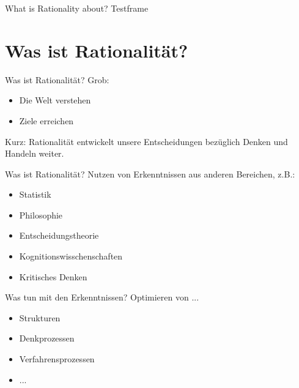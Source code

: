 \ifEnglish


\begin{frame}[c]{What is Rationality about?}
    Testframe
\end{frame}



\else

\section{Was ist Rationalität?}

\begin{frame}[c]{Was ist Rationalität?}
    \Large
    Grob:
    \newline
    \begin{itemize}
    \pause
    \item Die Welt verstehen    
    \newline
    \pause
    \pause
    \item Ziele erreichen       
    \newline
    \end{itemize}
    \pause
    \pause
    Kurz: Rationalität entwickelt unsere Entscheidungen bezüglich Denken und Handeln weiter.
\end{frame}


\begin{frame}[c]{Was ist Rationalität?}
    \Large
    Nutzen von Erkenntnissen aus anderen Bereichen, z.B.:
    \begin{itemize}
    \pause
    \item Statistik         
    \pause
    \pause
    \item Philosophie       
    \pause
    \pause
    \item Entscheidungstheorie  
    \pause
    \pause
    \item Kognitionswisschenschaften    
    \pause
    \pause
    \item Kritisches Denken 
    \end{itemize}
\end{frame}


\begin{frame}[c]{Was tun mit den Erkenntnissen?}
    \Large
    \pause
    Optimieren von ...
    \begin{itemize}
    \pause
    \item Strukturen
    \pause
    \item Denkprozessen
    \pause
    \item Verfahrensprozessen
    \pause
    \item ...
    \end{itemize}
\end{frame}





\fi
